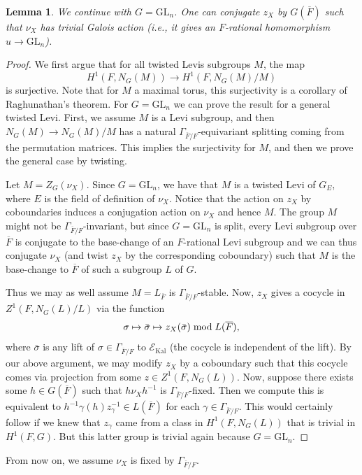 \documentclass[11pt]{amsart}
\newtheorem{lem}[thm]{Lemma}
\theoremstyle{definition}
\newcommand{\mc}{\mathcal}
\newcommand{\ov}{\overline}
\newcommand{\GL}{\mathrm{GL}}
\DeclareMathOperator{\Kal}{Kal}
\begin{document}
\begin{lem}\label{lemma:reg}
We continue with $G=\GL_n$. One can conjugate $z_X$ by $G(\ov{F})$ such that $\nu_X$ has trivial Galois action (i.e., it gives an $F$-rational homomorphism $u \to \GL_{n}$). 
\end{lem}
\begin{proof}
     We first argue that for all twisted Levis subgroups $M$, the map 
     \begin{equation*}
     H^1(F, N_G(M)) \rightarrow H^1(F, N_G(M)/M)
     \end{equation*}
     is surjective. Note that for $M$ a maximal torus, this surjectivity is a corollary of Raghunathan's theorem. For $G=\GL_n$ we can prove the result for a general twisted Levi. First, we assume $M$ is a Levi subgroup, and then  $N_G(M) \rightarrow N_G(M)/M$ has a natural $\Gamma_{\ov{F}/F}$-equivariant splitting coming from the permutation matrices. This implies the surjectivity for $M$, and then we prove the general case by twisting.

    Let $M= Z_{G}(\nu_X)$. Since $G=\GL_n$, we have that $M$ is a twisted Levi of $G_E$, where $E$ is the field of definition of $\nu_X$. Notice that the action on $z_X$ by coboundaries induces a conjugation action on $\nu_X$ and hence $M$. The group $M$ might not be $\Gamma_{\ov{F}/F}$-invariant, but since $G = \GL_{n}$ is split, every Levi subgroup over $\ov{F}$ is conjugate to the base-change of an $F$-rational Levi subgroup and we can thus conjugate $\nu_X$ (and twist $z_{X}$ by the corresponding coboundary) such that $M$ is the base-change to $\ov{F}$ of such a subgroup $L$ of $G$.

    Thus we may as well assume $M = L_{\ov{F}}$ is $\Gamma_{\ov{F}/F}$-stable.  Now, $z_X$ gives a cocycle in $Z^1(F, N_G(L)/L)$ via the function
    \begin{equation*}
        \sigma \mapsto \bar{\sigma} \mapsto z_{X}(\bar{\sigma}) \hspace{1mm} \text{mod} \hspace{1mm} L(\ov{F}),
    \end{equation*}
    where $\bar{\sigma}$ is any lift of $\sigma \in \Gamma_{\ov{F}/F}$ to $\mc{E}_{\Kal}$ (the cocycle is independent of the lift).
   By our above argument, we may modify $z_X$ by a coboundary such that this cocycle comes via projection from some $z \in Z^1(F, N_G(L))$. Now, suppose there exists some $h \in G(\ov{F})$ such that $h\nu_Xh^{-1}$ is $\Gamma_{\ov{F}/F}$-fixed. Then  we compute this is equivalent to $h^{-1}\gamma(h)z^{-1}_{\gamma} \in L(\ov{F})$ for each $\gamma \in \Gamma_{\ov{F}/F}$. This would certainly follow if we knew that $z_{\gamma}$ came from a class in $H^1(F, N_G(L))$ that is trivial in $H^1(F,G)$. But this latter group is trivial again because $G = \GL_{n}$.
\end{proof}
From now on, we assume $\nu_X$ is fixed by $\Gamma_{\ov{F}/F}$.
\end{document}
